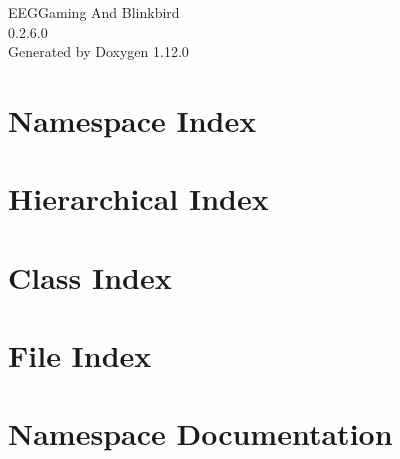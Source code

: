 \documentclass[twoside]{book}
\newcommand{\+}{\discretionary{\mbox{\scriptsize$\hookleftarrow$}}{}{}}
\newcommand{\clearemptydoublepage}{%
    \newpage{\pagestyle{empty}\cleardoublepage}%
  }
\begin{document}
  \raggedbottom
    \hypersetup{pageanchor=false,
                bookmarksnumbered=true,
                pdfencoding=unicode
               }
  \begin{titlepage}
  \vspace*{7cm}
  \begin{center}%
  {\Large EEGGaming And Blinkbird}\\
  [1ex]\large 0.\+2.\+6.\+0 \\
  \vspace*{1cm}
  {\large Generated by Doxygen 1.12.0}\\
  \end{center}
  \end{titlepage}
  \clearemptydoublepage
  \tableofcontents
  \clearemptydoublepage
  \hypersetup{pageanchor=true}

\chapter{Namespace Index}

\chapter{Hierarchical Index}

\chapter{Class Index}

\chapter{File Index}

\chapter{Namespace Documentation}









\end{document}
